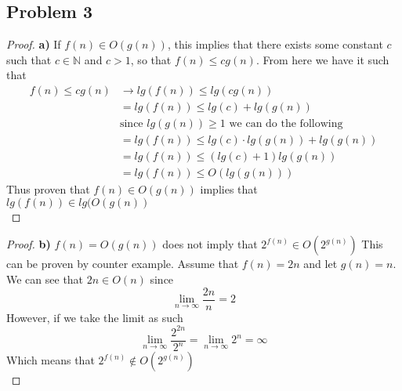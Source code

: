 \documentclass[12pt]{article}
\newcommand{\N}{\mathbb{N}}
\begin{document}
\subsection*{Problem 3}
\begin{proof}
\textbf{a)} If $f(n) \in O(g(n))$, this implies that there exists some constant $c$ such that $c \in \N$ and $c > 1$, so that $f(n) \leq cg(n)$. From here we have it such that
\begin{align*}
f(n) \leq cg(n) &\rightarrow lg(f(n)) \leq lg(cg(n))\\
&= lg(f(n)) \leq lg(c) + lg(g(n))\\
&\text{since $lg(g(n)) \geq 1$ we can do the following}\\
&= lg(f(n)) \leq lg(c) \cdot lg(g(n)) + lg(g(n))\\
&= lg(f(n)) \leq (lg(c) + 1)lg(g(n))\\
&= lg(f(n)) \leq O(lg(g(n)))
\end{align*}
Thus proven that $f(n) \in O(g(n))$ implies that $lg(f(n)) \in lg(O(g(n))$\\
\end{proof}
\begin{proof}
\textbf{b)} $f(n) = O(g(n))$ does not imply that $2^{f(n)} \in O(2^{g(n)})$ This can be proven by counter example. Assume that $f(n) = 2n$ and let $g(n) = n$. We can see that $2n \in O(n)$ since
\[ \lim_{n \rightarrow \infty} \dfrac{2n}{n} = 2 \]
However, if we take the limit as such
\[ \lim_{n \rightarrow \infty} \dfrac{2^{2n}}{2^n} = \lim_{n \rightarrow \infty} 2^n = \infty\]
Which means that $2^{f(n) }  \not \in O(2^{g(n)})$\\
\end{proof}
\end{document}
